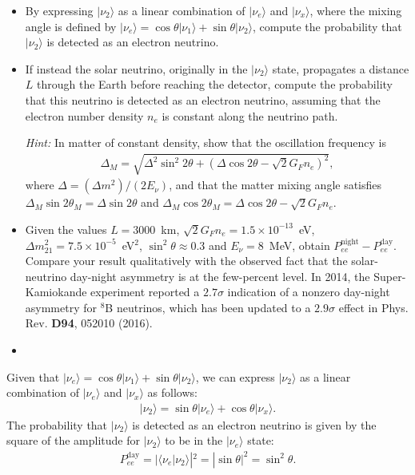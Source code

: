 \begin{itemize}
    \item [(a)] By expressing $|\nu_2\rangle$ as a linear combination of $|\nu_e\rangle$ and $|\nu_x\rangle$, where the mixing angle is defined by $|\nu_e\rangle=\cos\theta|\nu_1\rangle+\sin\theta|\nu_2\rangle$, compute the probability that $|\nu_2\rangle$ is detected as an electron neutrino.
    \item [(b)] If instead the solar neutrino, originally in the $|\nu_2\rangle$ state, propagates a distance $L$ through the Earth before reaching the detector, compute the probability that this neutrino is detected as an electron neutrino, assuming that the electron number density $n_e$ is constant along the neutrino path.
    
    \textit{Hint:} In matter of constant density, show that the oscillation frequency is 
    \begin{align}
        \Delta_M=\sqrt{\Delta^2 \sin^2 2\theta + (\Delta\cos2\theta-\sqrt{2}G_Fn_e)^2},
    \end{align}
    where $\Delta= (\Delta m^2)/(2E_\nu)$, and that the matter mixing angle satisfies $\Delta_M\sin2\theta_M=\Delta\sin2\theta$ and $\Delta_M\cos2\theta_M=\Delta\cos2\theta-\sqrt{2}G_F n_e$.
    \item [(c)] Given the values $L=3000$~km, $\sqrt{2}G_F n_e=1.5\times10^{-13}$~eV, $\Delta m_{21}^2=7.5\times 10^{-5}$~eV$^2$, $\sin^2\theta\approx0.3$ and $E_\nu=8$~MeV, obtain $P_{ee}^\text{night}-P_{ee}^\text{day}$. Compare your result qualitatively with the observed fact that the solar-neutrino day-night asymmetry is at the few-percent level. In 2014, the Super-Kamiokande experiment reported a $2.7\sigma$ indication of a nonzero day-night asymmetry for $^8$B neutrinos, which has been updated to a $2.9\sigma$ effect in Phys. Rev. \textbf{D94}, 052010 (2016).
\end{itemize}

\answer{}
\begin{itemize}
    \item [(a)]
\end{itemize}
Given that $|\nu_e\rangle=\cos\theta|\nu_1\rangle+\sin\theta|\nu_2\rangle$, we can express $|\nu_2\rangle$ as a linear combination of $|\nu_e\rangle$ and $|\nu_x\rangle$ as follows:
\begin{align}
    |\nu_2\rangle = \sin\theta |\nu_e\rangle + \cos\theta |\nu_x\rangle.
\end{align}
The probability that $|\nu_2\rangle$ is detected as an electron neutrino is given by the square of the amplitude for $|\nu_2\rangle$ to be in the $|\nu_e\rangle$ state:
\begin{align}
    P_{ee}^\text{day} = |\langle \nu_e | \nu_2 \rangle|^2 = |\sin\theta|^2 = \sin^2\theta.
\end{align}

